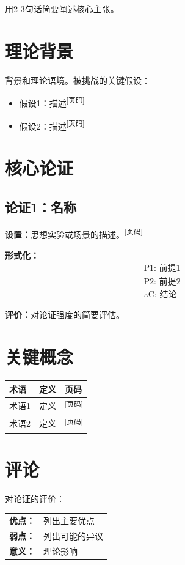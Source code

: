 \documentclass[10pt, a4paper]{article}
\newcommand{\pagemark}[1]{\textsuperscript{\scriptsize[#1]}}
\begin{document}
用2-3句话简要阐述核心主张。

\section*{理论背景}

背景和理论语境。被挑战的关键假设：
\begin{itemize}
  \item 假设1：描述\pagemark{页码}
  \item 假设2：描述\pagemark{页码}
\end{itemize}

\section*{核心论证}

\subsection*{论证1：名称}

\textbf{设置：}思想实验或场景的描述。\pagemark{页码}

\textbf{形式化：}
\begin{align*}
  &\text{P1: 前提1} \\
  &\text{P2: 前提2} \\
  &\therefore \text{C: 结论}
\end{align*}

\textbf{评价：}对论证强度的简要评估。

\section*{关键概念}

\begin{center}
\begin{tabular}{@{}lll@{}}
\toprule
\textbf{术语} & \textbf{定义} & \textbf{页码} \\
\midrule
术语1 & 定义 & \pagemark{页码} \\
术语2 & 定义 & \pagemark{页码} \\
\bottomrule
\end{tabular}
\end{center}

\section*{评论}

对论证的评价：\\[0.3em]
\begin{tabular}{@{}p{3.5cm}p{10cm}@{}}
\textbf{优点：} & 列出主要优点 \\[0.2em]
\textbf{弱点：} & 列出可能的异议 \\[0.2em]
\textbf{意义：} & 理论影响
\end{tabular}
\end{document}

